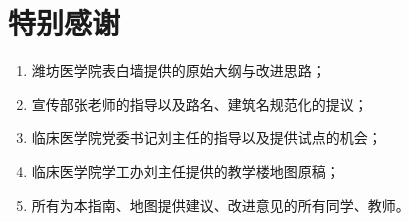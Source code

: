 \chapter*{特别感谢}
\begin{table}[H]
    \noindent\begin{enumerate}
        \item 潍坊医学院表白墙提供的原始大纲与改进思路；        
        \item 宣传部张老师的指导以及路名、建筑名规范化的提议；
        \item 临床医学院党委书记刘主任的指导以及提供试点的机会；
        \item 临床医学院学工办刘主任提供的教学楼地图原稿；
        \item 所有为本指南、地图提供建议、改进意见的所有同学、教师。
    \end{enumerate}
\end{table}